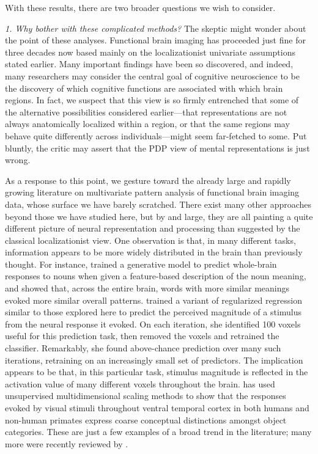 With these results, there are two broader questions we wish to consider.

{\em 1. Why bother with these complicated methods?} The skeptic might wonder about the point of these analyses. Functional brain imaging has proceeded just fine for three decades now based mainly on the localizationist univariate assumptions stated earlier. Many important findings have been so discovered, and indeed, many researchers may consider the central goal of cognitive neuroscience to be the discovery of which cognitive functions are associated with which brain regions. In fact, we suspect that this view is so firmly entrenched that some of the alternative possibilities considered earlier---that representations are not always anatomically localized within a region, or that the same regions may behave quite differently across individuals---might seem far-fetched to some. Put bluntly, the critic may assert that the PDP view of mental representations is just wrong. 

As a response to this point, we gesture toward the already large and rapidly growing literature on multivariate pattern analysis of functional brain imaging data, whose surface we have barely scratched. There exist many other approaches beyond those we have studied here, but by and large, they are all painting a quite different picture of neural representation and processing than suggested by the classical localizationist view. One observation is that, in many different tasks, information appears to be more widely distributed in the brain than previously thought. For instance, \cite{mitchell_predicting_2008} trained a generative model to predict whole-brain responses to nouns when given a feature-based description of the noun meaning, and showed that, across the entire brain, words with more similar meanings evoked more similar overall patterns. \cite{rish_sparse_2012} trained a variant of regularized regression similar to those explored here to predict the perceived magnitude of a stimulus from the neural response it evoked. On each iteration, she identified 100 voxels useful for this prediction task, then removed the voxels and retrained the classifier. Remarkably, she found above-chance prediction over many such iterations, retraining on an increasingly small set of predictors. The implication appears to be that, in this particular task, stimulus magnitude is reflected in the activation value of many different voxels throughout the brain. \cite{kriegeskorte_representational_2008} has used unsupervised multidimensional scaling methods to show that the responses evoked by visual stimuli throughout ventral temporal cortex in both humans and non-human primates express coarse conceptual distinctions amongst object categories. These are just a few examples of a broad trend in the literature; many more were recently reviewed by .

